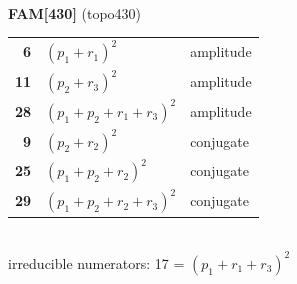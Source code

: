 \documentclass[10pt]{article}
\begin{document}
\begin{minipage}[t]{0.48\textwidth}
{}\\[2mm]\textbf{FAM[430]} (topo430)\\[2pt]{\footnotesize\begin{tabular}{@{}r@{\ \ }l@{\ \ }l@{}}\textbf{6} & $(p_1+r_1)^2$ & amplitude\\
\textbf{11} & $(p_2+r_3)^2$ & amplitude\\
\textbf{28} & $(p_1+p_2+r_1+r_3)^2$ & amplitude\\
\textbf{9} & $(p_2+r_2)^2$ & conjugate\\
\textbf{25} & $(p_1+p_2+r_2)^2$ & conjugate\\
\textbf{29} & $(p_1+p_2+r_2+r_3)^2$ & conjugate\\\end{tabular}}\\[2pt]{\scriptsize irreducible numerators: 17 = $(p_1+r_1+r_3)^2$}\end{minipage}

\bigskip
\end{document}

